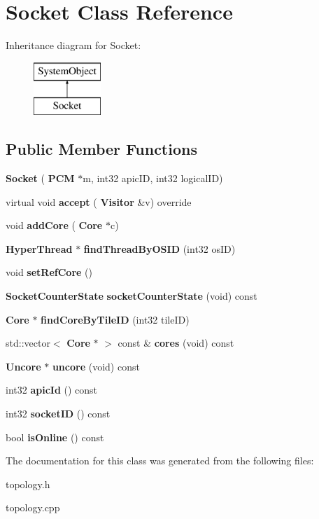 \section{Socket Class Reference}
\label{classSocket}
Inheritance diagram for Socket\+:\begin{figure}[H]
\begin{center}
\leavevmode
\includegraphics[height=2.000000cm]{classSocket}
\end{center}
\end{figure}
\subsection*{Public Member Functions}
\begin{DoxyCompactItemize}
\item 
\mbox{\label{classSocket_a6484316256e98155e624d115d986585e}} 
{\bfseries Socket} (\textbf{ P\+CM} $\ast$m, int32 apic\+ID, int32 logical\+ID)
\item 
\mbox{\label{classSocket_ae852fcf35c4a72a2eda9b76966bca711}} 
virtual void {\bfseries accept} (\textbf{ Visitor} \&v) override
\item 
\mbox{\label{classSocket_a5b74d22c335d4e03e5adb7b58ab425d5}} 
void {\bfseries add\+Core} (\textbf{ Core} $\ast$c)
\item 
\mbox{\label{classSocket_a364949f67948bceab276fd6488f6a234}} 
\textbf{ Hyper\+Thread} $\ast$ {\bfseries find\+Thread\+By\+O\+S\+ID} (int32 os\+ID)
\item 
\mbox{\label{classSocket_a6ea7dbc0a173fed2b0e1c96d22740e53}} 
void {\bfseries set\+Ref\+Core} ()
\item 
\mbox{\label{classSocket_a60ea9d6aa329711854672db8218f8c2c}} 
\textbf{ Socket\+Counter\+State} {\bfseries socket\+Counter\+State} (void) const
\item 
\mbox{\label{classSocket_a9ea2120b6397320562791f2520547401}} 
\textbf{ Core} $\ast$ {\bfseries find\+Core\+By\+Tile\+ID} (int32 tile\+ID)
\item 
\mbox{\label{classSocket_ac8850cbf624c4635cbaae750fe842b1f}} 
std\+::vector$<$ \textbf{ Core} $\ast$ $>$ const  \& {\bfseries cores} (void) const
\item 
\mbox{\label{classSocket_a3fbed782fd00bd876a684bf033495e8c}} 
\textbf{ Uncore} $\ast$ {\bfseries uncore} (void) const
\item 
\mbox{\label{classSocket_a1abe1661edcf92c124712c78b185cf72}} 
int32 {\bfseries apic\+Id} () const
\item 
\mbox{\label{classSocket_ada70cd87c7a1fcd4acc11718c2f8ae74}} 
int32 {\bfseries socket\+ID} () const
\item 
\mbox{\label{classSocket_a07d5f709199730feaea6d420f89128b8}} 
bool {\bfseries is\+Online} () const
\end{DoxyCompactItemize}


The documentation for this class was generated from the following files\+:\begin{DoxyCompactItemize}
\item 
topology.\+h\item 
topology.\+cpp\end{DoxyCompactItemize}
